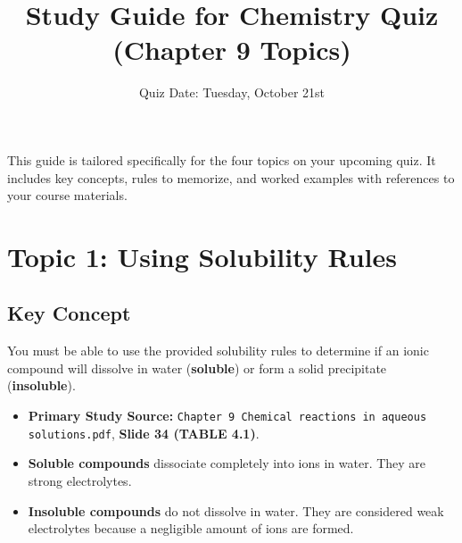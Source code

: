 \documentclass{article}
\title{Study Guide for Chemistry Quiz (Chapter 9 Topics)}
\author{Quiz Date: Tuesday, October 21st}
\date{}
\begin{document}
\maketitle %

This guide is tailored specifically for the four topics on your upcoming quiz. It includes key concepts, rules to memorize, and worked examples with references to your course materials.

\section*{Topic 1: Using Solubility Rules}

\subsection*{Key Concept}
You must be able to use the provided solubility rules to determine if an ionic compound will dissolve in water (\textbf{soluble}) or form a solid precipitate (\textbf{insoluble}).

\begin{itemize}[itemsep=5pt]
    \item \textbf{Primary Study Source:} \texttt{Chapter 9 Chemical reactions in aqueous solutions.pdf}, \textbf{Slide 34 (TABLE 4.1)}.
    \item \textbf{Soluble compounds} dissociate completely into ions in water. They are strong electrolytes.
    \item \textbf{Insoluble compounds} do not dissolve in water. They are considered weak electrolytes because a negligible amount of ions are formed.
\end{itemize}
\end{document}
